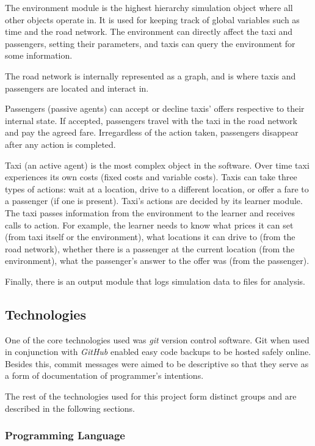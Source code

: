 The environment module is the highest hierarchy simulation object where all
other objects operate in. It is used for keeping track of global variables such
as time and the road network. The environment can directly affect the taxi and
passengers, setting their parameters, and taxis can query the environment for
some information.

The road network is internally represented as a graph, and is where taxis and
passengers are located and interact in.

Passengers (passive agents) can accept or decline taxis' offers respective to
their internal state. If accepted, passengers travel with the taxi in the road
network and pay the agreed fare. Irregardless of the action taken, passengers
disappear after any action is completed.

Taxi (an active agent) is the most complex object in the software. Over time
taxi experiences its own costs (fixed costs and variable costs). Taxis can take
three types of actions: wait at a location, drive to a different location, or
offer a fare to a passenger (if one is present). Taxi's actions are decided by
its learner module. The taxi passes information from the environment to the
learner and receives calls to action. For example, the learner needs to know
what prices it can set (from taxi itself or the environment), what locations it
can drive to (from the road network), whether there is a passenger at the
current location (from the environment), what the passenger's answer to the
offer was (from the passenger).

Finally, there is an output module that logs simulation data to files for
analysis.


\subsection{Technologies}

One of the core technologies used was \textit{git} \parencite{Git} version
control software. Git when used in conjunction with \textit{GitHub}
\parencite{Github} enabled easy code backups to be hosted safely online.
Besides this, commit messages were aimed to be descriptive so that they serve
as a form of documentation of programmer's intentions.

The rest of the technologies used for this project form distinct groups and are
described in the following sections.

\subsubsection{Programming Language}

